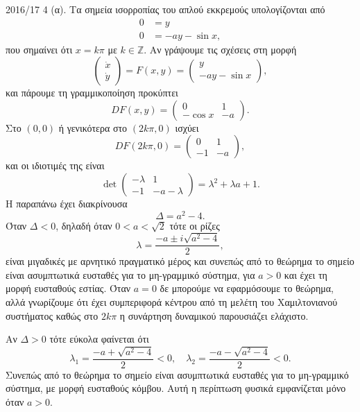 \begin{solution}{2016/17 4}
    (α). Τα σημεία ισορροπίας του απλού εκκρεμούς υπολογίζονται από
    \begin{align*}
        0 &= y \\
        0 &= -a y - \sin{x},
    \end{align*}
    που σημαίνει ότι \( x = k\pi \) με \( k \in \mathbb{Z} \). Αν γράψουμε τις
    σχέσεις στη μορφή
    \[
        \begin{pmatrix}
            \dot{x} \\
            \dot{y}
        \end{pmatrix} = F(x, y) =
        \begin{pmatrix}
            y \\
            -a y - \sin{x}
        \end{pmatrix},
    \]
    και πάρουμε τη γραμμικοποίηση προκύπτει
    \[
        DF(x, y) =
        \begin{pmatrix}
            0 & 1 \\
            -\cos{x} & -a
        \end{pmatrix}.
    \]
    Στο \( (0, 0) \) ή γενικότερα στο \( (2k\pi, 0) \) ισχύει
    \[
        DF(2k\pi, 0) =
        \begin{pmatrix}
            0 & 1 \\
            -1 & -a
        \end{pmatrix},
    \]
    και οι ιδιοτιμές της είναι
    \[
        \det
        \begin{pmatrix}
            -\lambda & 1 \\
            -1 & -a - \lambda
        \end{pmatrix}
        = \lambda^2 + \lambda a + 1.
    \]
    Η παραπάνω έχει διακρίνουσα
    \[
        \Delta = a^2 - 4.
    \]
    Όταν \( \Delta < 0 \), δηλαδή όταν \( 0 < a < \sqrt{2} \) τότε οι ρίζες
    \[
        \lambda = \frac{-a \pm i \sqrt{a^2 - 4}}{2},
    \]
    είναι μιγαδικές με αρνητικό πραγματικό μέρος και συνεπώς από το θεώρημα
     το σημείο είναι ασυμπτωτικά ευσταθές για το μη-γραμμικό
    σύστημα, για \( a > 0 \) και έχει τη μορφή ευσταθούς εστίας. Όταν \( a = 0 \)
    δε μπορούμε να εφαρμόσουμε το θεώρημα, αλλά γνωρίζουμε ότι έχει συμπεριφορά
    κέντρου από τη μελέτη του Χαμιλτονιανού συστήματος καθώς στο \( 2k\pi \) η
    συνάρτηση δυναμικού παρουσιάζει ελάχιστο.

    Αν \( \Delta > 0 \) τότε εύκολα φαίνεται ότι
    \[
        \lambda_1 = \frac{-a + \sqrt{a^2 - 4}}{2} < 0, \quad
        \lambda_2 = \frac{-a - \sqrt{a^2 - 4}}{2} < 0.
    \]
    Συνεπώς από το θεώρημα  το σημείο είναι
    ασυμπτωτικά ευσταθές για το μη-γραμμικό σύστημα, με μορφή ευσταθούς κόμβου.
    Αυτή η περίπτωση φυσικά εμφανίζεται μόνο όταν \( a > 0 \).


\end{solution}
